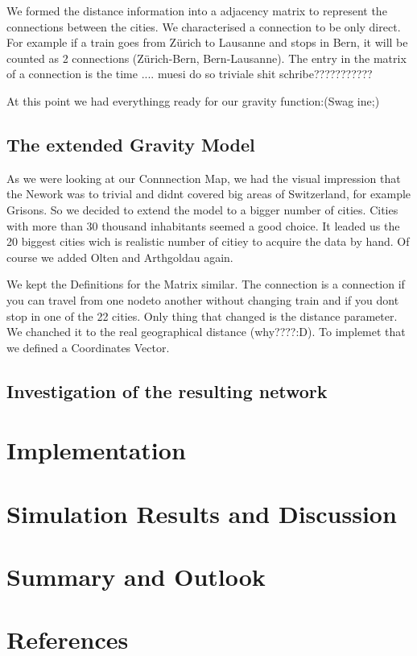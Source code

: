 \documentclass[11pt]{article}
\begin{document}
We formed the distance information into a adjacency matrix to represent the connections between the cities.  We characterised a connection to be only direct. For example if a train goes from Zürich to Lausanne and stops in Bern, it will be counted as 2 connections (Zürich-Bern, Bern-Lausanne). The entry in the matrix of a connection is the time .... muesi do so triviale shit schribe???????????

At this point we had everythingg ready for our gravity function:(Swag ine;)



\subsection{The extended Gravity Model}


As we were looking at our Connnection Map, we had the visual impression that the Nework was to trivial and didnt covered big areas of Switzerland, for example Grisons. So we decided to extend the model to a bigger number of cities. Cities with more than 30 thousand inhabitants seemed a good choice. It leaded us the 20 biggest cities wich is realistic number of citiey to acquire the data by hand.  Of course we added Olten and Arthgoldau again.

We kept the Definitions for the Matrix similar. The connection is a connection if you can travel from one nodeto another without changing train and if you dont stop in one of the 22 cities. Only thing that changed is the distance parameter. We chanched it to the real geographical distance (why????:D). To implemet that we defined a Coordinates Vector.


\subsection{Investigation of the resulting network}



\section{Implementation}

\section{Simulation Results and Discussion}

\section{Summary and Outlook}

\section{References}
\end{document}
